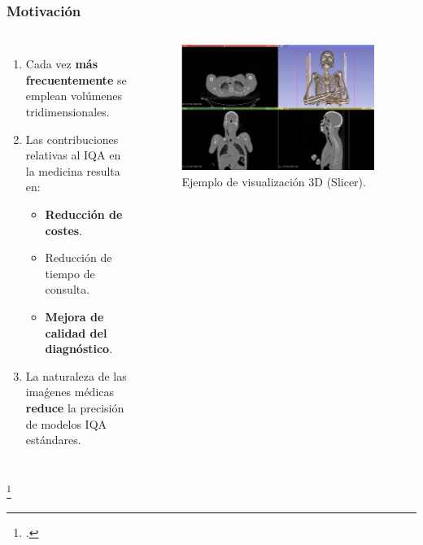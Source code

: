 \begin{frame}
  \frametitle{Motivación}
  \begin{columns}
    \begin{enumerate}
    \item Cada vez \textbf{más frecuentemente} se emplean volúmenes tridimensionales.
    \item Las contribuciones relativas al IQA en la medicina resulta en: 
      \begin{itemize}
        \item \textbf{Reducción de costes}. 
        \item Reducción de tiempo de consulta.
        \item \textbf{Mejora de calidad del diagnóstico}.
      \end{itemize}
    \item La naturaleza de las imaǵenes médicas \textbf{reduce} la precisión de modelos IQA estándares.
    \end{enumerate}
  \begin{figure}
    \begin{center}
      \includegraphics[width=0.95\textwidth]{imagenes/chapter1/SlicerVisualization}
    \end{center}
    \caption{Ejemplo de visualización 3D (Slicer\footnotemark).}
  \end{figure}
  \end{columns}
  \footcitetext{Slicer3D}
\end{frame}



